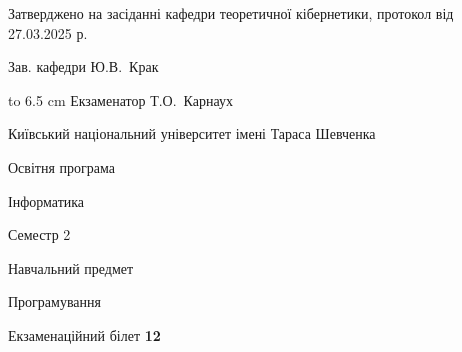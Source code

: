 \documentclass[12pt, ukrainian]{article}
\begin{document}
{\smallskip\smallskip \begin {scriptsize} Затверджено на засіданні кафедри теоретичної кібернетики, протокол   від   27.03.2025 р.\par\smallskip\smallskip\smallskip\smallskip
{\parbox {6.5 cm} {Зав. кафедри \dotfill Ю.В.~Крак}}\hspace {0.7cm} {\hbox to 6.5 cm { Екзаменатор \dotfill Т.О.~Карнаух}} \end{scriptsize}}
\newpage
{{\begin {scriptsize}\par
{ \center  Київський національний університет імені Тараса Шевченка \par}
{\parbox {5 cm}{Освітня програма \hfill}{\parbox {7 cm}{Інформатика\hfill}}\parbox {6 cm}{\hfill Семестр 2}}\par
{\parbox {5 cm} {Навчальний предмет \hfill}\parbox {7 cm}{Програмування \hfill}\parbox {6cm}{\hfill}\par}\vspace{-15pt} \end{scriptsize}}{\center Екзаменаційний білет \No \textbf { 12 }\par}}
\end{document}
